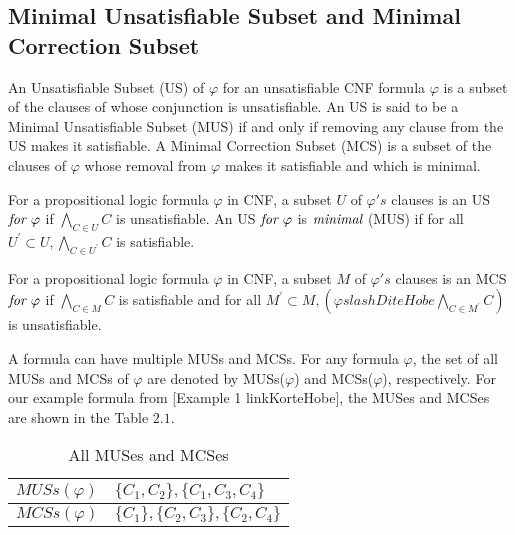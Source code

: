 \subsection{Minimal Unsatisfiable Subset and Minimal Correction Subset}
An Unsatisfiable Subset (US) of $\varphi$ for an unsatisfiable CNF formula $\varphi$ is a subset of the clauses of whose conjunction is unsatisfiable. An US is said to be a Minimal Unsatisfiable Subset (MUS) if and only if removing any clause from the US makes it satisfiable. A Minimal Correction Subset (MCS) is a subset of the clauses of $\varphi$ whose removal from $\varphi$ makes it satisfiable and which is minimal.
\begin{definition}[MUS]
	\label{def:mus}
	For a propositional logic formula $\varphi$ in CNF, a subset $U$ of $\varphi 's$ clauses is an US $\emph{for $\varphi$}$ if $\bigwedge \limits_{C\in U}C$ is unsatisfiable. An US $\emph{for $\varphi$}$ is $\emph{minimal}$ (MUS) if for all $U^{\prime}\subset U, \bigwedge \limits_{C\in U^{\prime}}C$ is satisfiable.
\end{definition}
\begin{definition}[MCS]
	\label{def:mcs}
	For a propositional logic formula $\varphi$ in CNF, a subset $M$ of $\varphi 's$ clauses is an MCS $\emph{for $\varphi$}$ if $\bigwedge \limits_{C \in M}C$ is satisfiable and for all $M^{\prime}\subset M, (\varphi slashDiteHobe \bigwedge \limits_{C\in M^{\prime}}C)$ is unsatisfiable.
\end{definition}
A formula can have multiple MUSs and MCSs. For any formula $\varphi$, the set of all MUSs and MCSs of $\varphi$ are denoted by MUSs($\varphi$) and MCSs($\varphi$), respectively.
For our example formula from [Example 1 linkKorteHobe], the MUSes and MCSes are shown in the Table $2.1$.
\begin{table}[]
	\centering
	\caption{All MUSes and MCSes}
	\label{my-label}
	\begin{tabular}{|l|l|}
		\hline
		$MUSs(\varphi)$ & $\{C_{1},C_{2}\},\{C_{1},C_{3},C_{4}\}$ \\ \hline
		$MCSs(\varphi)$ & $\{C_{1}\},\{C_{2},C_{3}\},\{C_{2},C_{4}\}$ \\ \hline
	\end{tabular}
\end{table}
